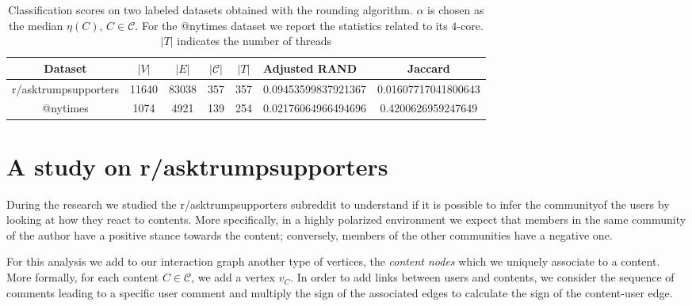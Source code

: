 \begin{table}
	\centering
	\caption{Classification scores on two labeled datasets obtained with the
	rounding algorithm. $\alpha $ is chosen as the median $\eta(C)$, $C \in
		\mathcal{C} $. For the @nytimes dataset we report the statistics
	related to its $4$-core. $|{T}|$ indicates the number of threads}
	\label{tab:scores-datasets-labeled}
	{\small
		\begin{tabular}{|ccccc p{1.8cm} c|}
			\toprule
			Dataset                     & $|V|$         & $|E|$                     & $|\mathcal{C}| $          &
			$|{T}| $                    & Adjusted RAND & Jaccard                                                                                                            \\
			\midrule
			\hline r/asktrumpsupporters & 11640         & 83038                     & 357
			                            & 357           & \num{0.09453599837921367} & \num{0.01607717041800643}                                                              \\
			@nytimes                    & 1074          & 4921                      & 139                       & 254 & \num{0.02176064966494696} & \num{0.4200626959247649} \\
			\bottomrule
		\end{tabular}
	}
\end{table}

\section{A study on r/asktrumpsupporters}%
\label{sec:the_r_asktrumpsupporters_case}

During the research we studied the r/asktrumpsupporters subreddit to
understand if it is possible to infer the community\footnotemark of the users by
looking at how they react to contents. More specifically, in a highly polarized
environment we expect that members in the same community of the
author have a positive stance towards the content; conversely, members of the
other communities have a negative one.


\bigskip

For this analysis we add to our interaction graph another type of vertices, the
\emph{content nodes} which we uniquely associate to a content. More formally,
for each content $C \in \mathcal{C} $, we add a vertex $v_C$. In order to
add links between users and contents, we consider the sequence of comments
leading to a specific user comment and multiply the sign of the
associated edges to calculate the sign of the content-user edge.


